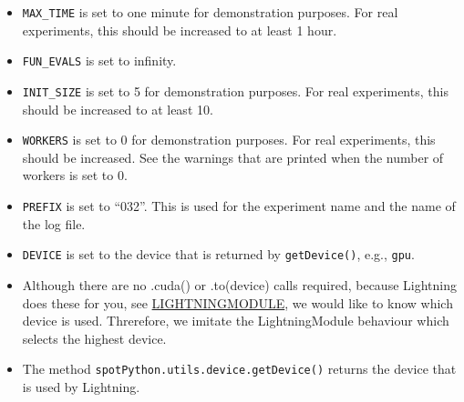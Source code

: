 \documentclass[
  letterpaper,
  DIV=11,
  numbers=noendperiod]{scrreprt}
\providecommand{\tightlist}{%
  \setlength{\itemsep}{0pt}\setlength{\parskip}{0pt}}\usepackage{longtable,booktabs,array}
\begin{document}
\begin{tcolorbox}[enhanced jigsaw, rightrule=.15mm, coltitle=black, title=\textcolor{quarto-callout-caution-color}{\faFire}\hspace{0.5em}{Caution: Run time and initial design size should be increased for real
experiments}, opacitybacktitle=0.6, bottomrule=.15mm, opacityback=0, left=2mm, colback=white, leftrule=.75mm, colframe=quarto-callout-caution-color-frame, colbacktitle=quarto-callout-caution-color!10!white, toprule=.15mm, toptitle=1mm, bottomtitle=1mm, titlerule=0mm, breakable, arc=.35mm]

\begin{itemize}
\tightlist
\item
  \texttt{MAX\_TIME} is set to one minute for demonstration purposes.
  For real experiments, this should be increased to at least 1 hour.
\item
  \texttt{FUN\_EVALS} is set to infinity.
\item
  \texttt{INIT\_SIZE} is set to 5 for demonstration purposes. For real
  experiments, this should be increased to at least 10.
\item
  \texttt{WORKERS} is set to 0 for demonstration purposes. For real
  experiments, this should be increased. See the warnings that are
  printed when the number of workers is set to 0.
\item
  \texttt{PREFIX} is set to ``032''. This is used for the experiment
  name and the name of the log file.
\item
  \texttt{DEVICE} is set to the device that is returned by
  \texttt{getDevice()}, e.g., \texttt{gpu}.
\end{itemize}

\end{tcolorbox}

\begin{tcolorbox}[enhanced jigsaw, rightrule=.15mm, coltitle=black, title=\textcolor{quarto-callout-note-color}{\faInfo}\hspace{0.5em}{Note: Device selection}, opacitybacktitle=0.6, bottomrule=.15mm, opacityback=0, left=2mm, colback=white, leftrule=.75mm, colframe=quarto-callout-note-color-frame, colbacktitle=quarto-callout-note-color!10!white, toprule=.15mm, toptitle=1mm, bottomtitle=1mm, titlerule=0mm, breakable, arc=.35mm]

\begin{itemize}
\tightlist
\item
  Although there are no .cuda() or .to(device) calls required, because
  Lightning does these for you, see
  \href{https://lightning.ai/docs/pytorch/stable/common/lightning_module.html}{LIGHTNINGMODULE},
  we would like to know which device is used. Threrefore, we imitate the
  LightningModule behaviour which selects the highest device.
\item
  The method \texttt{spotPython.utils.device.getDevice()} returns the
  device that is used by Lightning.
\end{itemize}

\end{tcolorbox}
\end{document}
